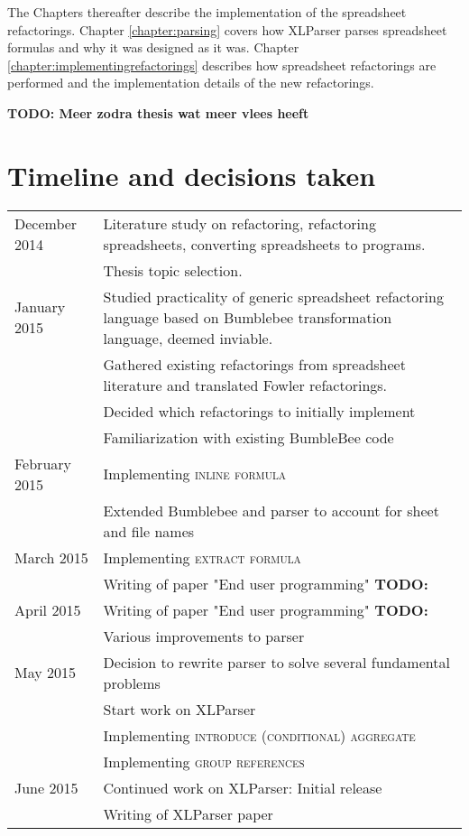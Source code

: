 \documentclass[12pt,a4paper,onecolumn,oneside,parskip]{memoir}
\newcommand{\todo}[1]{\textbf{TODO: #1}}
\newcommand{\rf}[1]{\textsc{\lowercase{#1}}}
\begin{document}
The Chapters thereafter describe the implementation of the spreadsheet refactorings.
Chapter \ref{chapter:parsing} covers how XLParser parses spreadsheet formulas and why it was designed as it was.
Chapter \ref{chapter:implementingrefactorings} describes how spreadsheet refactorings are performed and the implementation details of the new refactorings.

\todo{Meer zodra thesis wat meer vlees heeft}

\clearpage
\section{Timeline and decisions taken}

\begin{tabularx}{\textwidth}{lX}
\toprule
December 2014 & Literature study on refactoring, refactoring spreadsheets, converting spreadsheets to programs. \\
& Thesis topic selection. \\
January 2015 & Studied practicality of generic spreadsheet refactoring language based on Bumblebee transformation language, deemed inviable. \\
& Gathered existing refactorings from spreadsheet literature and translated Fowler refactorings. \\
& Decided which refactorings to initially implement \\
& Familiarization with existing BumbleBee code \\
February 2015 & Implementing \rf{Inline Formula} \\
& Extended Bumblebee and parser to account for sheet and file names \\
March 2015 & Implementing \rf{Extract formula} \\
& Writing of paper "End user programming" \todo{} \\
April 2015 & Writing of paper "End user programming" \todo{} \\
& Various improvements to parser \\
May 2015 & Decision to rewrite parser to solve several fundamental problems \\
& Start work on XLParser \\
& Implementing \rf{Introduce (Conditional) Aggregate} \\
& Implementing \rf{Group references} \\
June 2015 & Continued work on XLParser: Initial release \\
& Writing of XLParser paper \\

\end{tabularx}
\end{document}
